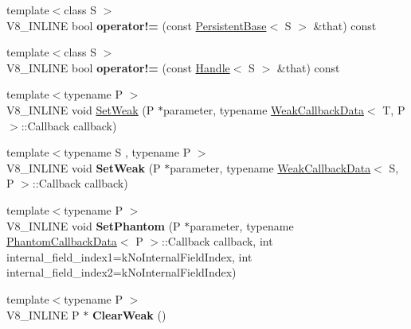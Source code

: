 \begin{DoxyCompactItemize}
\item 
\hypertarget{classv8_1_1_persistent_base_a5bfacec9ab828f9aa7abdb980481589a}{}{\footnotesize template$<$class S $>$ }\\V8\+\_\+\+I\+N\+L\+I\+N\+E bool {\bfseries operator!=} (const \hyperlink{classv8_1_1_persistent_base}{Persistent\+Base}$<$ S $>$ \&that) const \label{classv8_1_1_persistent_base_a5bfacec9ab828f9aa7abdb980481589a}

\item 
\hypertarget{classv8_1_1_persistent_base_acc30195c1ee4e1f801cab267e6855fd3}{}{\footnotesize template$<$class S $>$ }\\V8\+\_\+\+I\+N\+L\+I\+N\+E bool {\bfseries operator!=} (const \hyperlink{classv8_1_1_handle}{Handle}$<$ S $>$ \&that) const \label{classv8_1_1_persistent_base_acc30195c1ee4e1f801cab267e6855fd3}

\item 
{\footnotesize template$<$typename P $>$ }\\V8\+\_\+\+I\+N\+L\+I\+N\+E void \hyperlink{classv8_1_1_persistent_base_a1fb3293eff7a66068de13d152f73f308}{Set\+Weak} (P $\ast$parameter, typename \hyperlink{classv8_1_1_weak_callback_data}{Weak\+Callback\+Data}$<$ T, P $>$\+::Callback callback)
\item 
\hypertarget{classv8_1_1_persistent_base_a297e0c410e9496318187853e07bf8406}{}{\footnotesize template$<$typename S , typename P $>$ }\\V8\+\_\+\+I\+N\+L\+I\+N\+E void {\bfseries Set\+Weak} (P $\ast$parameter, typename \hyperlink{classv8_1_1_weak_callback_data}{Weak\+Callback\+Data}$<$ S, P $>$\+::Callback callback)\label{classv8_1_1_persistent_base_a297e0c410e9496318187853e07bf8406}

\item 
\hypertarget{classv8_1_1_persistent_base_a3257dfb0802f812c22dc09a998910c69}{}{\footnotesize template$<$typename P $>$ }\\V8\+\_\+\+I\+N\+L\+I\+N\+E void {\bfseries Set\+Phantom} (P $\ast$parameter, typename \hyperlink{classv8_1_1_phantom_callback_data}{Phantom\+Callback\+Data}$<$ P $>$\+::Callback callback, int internal\+\_\+field\+\_\+index1=k\+No\+Internal\+Field\+Index, int internal\+\_\+field\+\_\+index2=k\+No\+Internal\+Field\+Index)\label{classv8_1_1_persistent_base_a3257dfb0802f812c22dc09a998910c69}

\item 
\hypertarget{classv8_1_1_persistent_base_a444d27c00650e3663348024df08cb121}{}{\footnotesize template$<$typename P $>$ }\\V8\+\_\+\+I\+N\+L\+I\+N\+E P $\ast$ {\bfseries Clear\+Weak} ()\label{classv8_1_1_persistent_base_a444d27c00650e3663348024df08cb121}


\end{DoxyCompactItemize}
